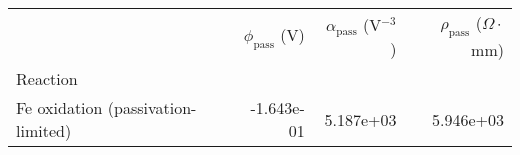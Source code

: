 \begin{tabular}{lrrr}
\toprule
{} &  $\phi_{\text{pass}}$ (V) &  $\alpha_{\text{pass}}$ (V$^{-3}$) &  $\rho_{\text{pass}}$ ($\Omega \cdot$mm) \\
Reaction                           &                           &                                    &                                          \\
\midrule
Fe oxidation (passivation-limited) &                -1.643e-01 &                          5.187e+03 &                                5.946e+03 \\
\bottomrule
\end{tabular}
